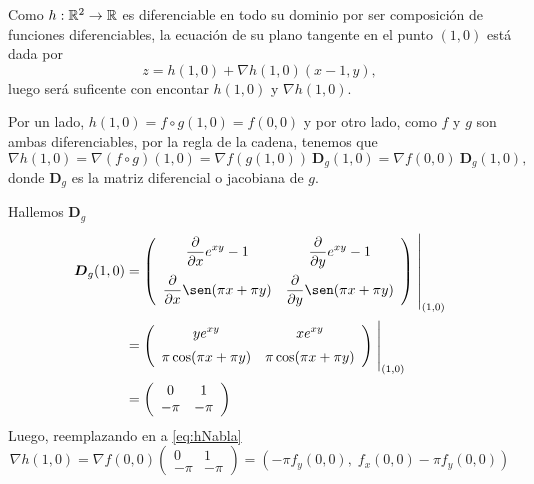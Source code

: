 \begin{solution}

    Como   $h:\mathbb{R}^2\to\mathbb{R}$ es diferenciable en todo su dominio por ser composición de funciones diferenciables,  la ecuaci\'on de su plano tangente en el punto $(1,0)$ est\'a dada por
    \begin{equation}
        z= h(1,0) + \nabla h(1,0) (x-1,y),  \label{eq:zNabla}
    \end{equation}   luego ser\'a  suficente con encontar $ h(1,0)$ y $\nabla h(1,0).$

    Por un lado,      $h(1,0)= f\circ g (1,0) =  f(0,0)$  y por otro lado,  como $f$ y $g$ son ambas diferenciables,  por la regla de la cadena,  tenemos que
    \begin{equation}
        \nabla h(1,0)=\nabla (f\circ g)(1,0)=\nabla f(g(1,0)) \:\boldsymbol{D}_g(1,0) = \nabla f (0,0) \:\boldsymbol{D}_g(1,0),  \label{eq:hNabla}
    \end{equation}    donde $\boldsymbol{D}_g$ es la matriz diferencial o  jacobiana de $g$.

    \noindent  Hallemos $\boldsymbol{D}_g$
    \begin{align*}
        \boldsymbol{D}_g(1,0) & =
        \left(\begin{array}{cc}
                      \displaystyle\partialx e^{xy}-1            & \displaystyle\partialy e^{xy}-1           \\[10pt]
                      \displaystyle\partialx  \sen (\pi x+\pi y) & \displaystyle\partialy \sen (\pi x+\pi y)
                  \end{array}\right)\left.\rule{0pt}{1.1cm}\right\rvert_{(1,0)}             \\[2pt]
                              & =\left(\begin{array}{cc}
                                               \displaystyle ye^{xy}                 & \displaystyle xe^{xy}              \\[5pt]
                                               \displaystyle   \pi\cos (\pi x+\pi y) & \displaystyle \pi\cos(\pi x+\pi y)
                                           \end{array}\right)\left.\rule{0pt}{0.7cm}\right\rvert_{(1,0)} \\[2pt]
                              & =\left(\begin{array}{cc}
                                               0    & 1    \\
                                               -\pi & -\pi
                                           \end{array}\right)
    \end{align*}
    Luego, reemplazando en  a   \eqref{eq:hNabla}
    \[
        \nabla h(1,0) = \nabla f(0,0)\left(\begin{array}{cc}
                0    & 1    \\
                -\pi & -\pi
            \end{array}\right) = \left(-\pi f_y(0,0),\;f_x(0,0)-\pi f_y(0,0)\right)
    \]


\end{solution}
